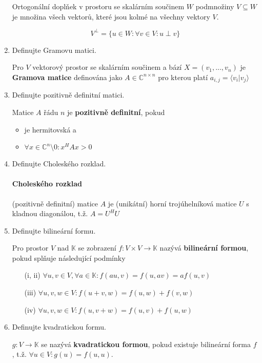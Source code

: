 \documentclass[10pt,a4paper]{article}
\theoremstyle{plain}
\begin{document}
\begin{enumerate}
Ortogonální doplňek v prostoru se skalárním součinem $W$ podmnožiny $V \subseteq W$ je množina všech vektorů, které jsou kolmé na všechny vektory $V$.

\[ V^\perp = \lbrace u \in W: \forall v \in V: u \perp v \rbrace \]

\item Definujte Gramovu matici.

Pro $V$ vektorový prostor se skalárním součinem a bází $X = (v_1, ..., v_n)$ je \textbf{Gramova matice} definována jako $A \in \mathbb{C}^{n \times n}$ pro kterou platí $a_{i,j} = \langle v_i | v_j \rangle$


\item Definujte pozitivně definitní matici.

Matice $A$ řádu $n$ je \textbf{pozitivně definitní}, pokud
\begin{itemize}
\item je hermitovská a
\item $\forall x \in \mathbb{C}^n \setminus 0: x^HAx > 0$
\end{itemize}

\item Definujte Choleského rozklad.

\paragraph{Choleského rozklad} (pozitivně definitní) matice $A$ je (unikátní) horní trojúhelníková matice $U$ s kladnou diagonálou, t.ž. $A = U^HU$

\item Definujte bilineární formu.

Pro prostor $V$ nad $\mathbb{K}$ se zobrazení $f: V \times V \to \mathbb{K}$ nazývá \textbf{bilineární formou}, pokud splňuje následující podmínky 
\begin{enumerate}[label=(\roman*)]
\item[(i, ii)] $\forall u,v \in V, \forall a \in \mathbb{K}: f(au,v) = f(u,av) = af(u,v)$
\item[(iii)] $\forall u,v,w \in V : f(u+v,w) = f(u,w) + f(v,w)$
\item[(iv)] $\forall u,v,w \in V : f(u,v+w) = f(u,v) + f(u,w)$
\end{enumerate}

\item Definujte kvadratickou formu.

$g: V \to \mathbb{K}$ se nazývá \textbf{kvadratickou formou}, pokud existuje bilineární forma $f$, t.ž. $\forall u \in V: g(u) = f(u,u)$.


\end{enumerate}
\end{document}
